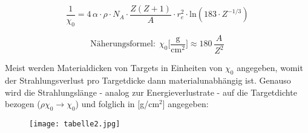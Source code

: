 \[\frac{1}{\chi_0}=4\,\alpha\cdot \rho\cdot N_A \cdot\frac{Z(Z+1)}{A}\cdot
r_e^2\cdot\text{ln}\left(183\cdot Z^{-1/3}\right)\]

\[\text{Näherungsformel:}~~\chi_0\bigg[\frac{\text{g}}{\text{cm}^2}\bigg] \approx
180~\frac{A}{Z^2}\] 

Meist werden Materialdicken von Targets in Einheiten von $\chi_0$ angegeben, womit der
Strahlungsverlust pro Targetdicke dann materialunabhängig ist. Genauso wird die Strahlungslänge -
analog zur Energieverlustrate - auf die Targetdichte bezogen ($\rho \chi_0\rightarrow\chi_0$) und
folglich in [g/cm$^2$] angegeben:

\begin{figure}[H]
	\centering
	\texttt{[image: tabelle2.jpg]}
\end{figure}

\FloatBarrier